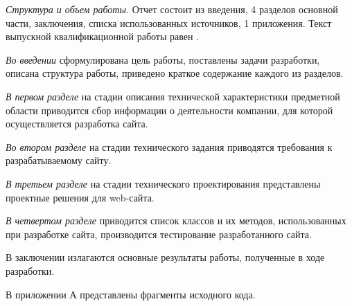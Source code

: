 \emph{Структура и объем работы.} Отчет состоит из введения, 4 разделов основной части, заключения, списка использованных источников, 1 приложения. Текст выпускной квалификационной работы равен .

\emph{Во введении} сформулирована цель работы, поставлены задачи разработки, описана структура работы, приведено краткое содержание каждого из разделов.

\emph{В первом разделе} на стадии описания технической характеристики предметной области приводится сбор информации о деятельности компании, для которой осуществляется разработка сайта.

\emph{Во втором разделе} на стадии технического задания приводятся требования к разрабатываемому сайту.

\emph{В третьем разделе} на стадии технического проектирования представлены проектные решения для web-сайта.

\emph{В четвертом разделе} приводится список классов и их методов, использованных при разработке сайта, производится тестирование разработанного сайта.

В заключении излагаются основные результаты работы, полученные в ходе разработки.

В приложении А представлены фрагменты исходного кода. 
